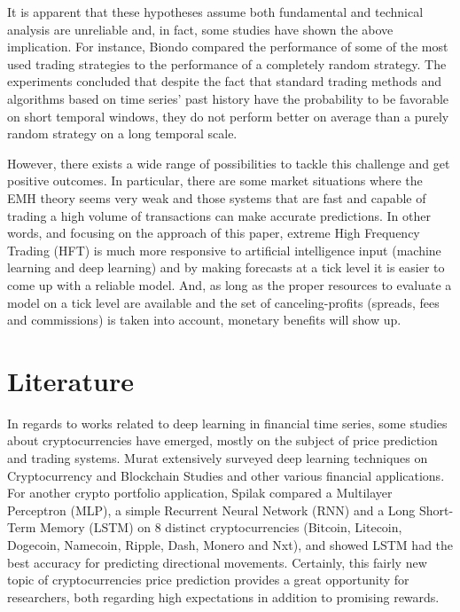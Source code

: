 \documentclass[10pt,twocolumn,letterpaper]{article}
\begin{document}
It is apparent that these hypotheses assume both fundamental and technical analysis are unreliable and, in fact, some studies have shown the above implication. For instance, Biondo \etal \cite{Biondo} compared the performance of some of the most used trading strategies to the performance of a completely random strategy. The experiments concluded that despite the fact that standard trading methods and algorithms based on time series’ past history have the probability to be favorable on short temporal windows, they do not perform better on average than a purely random strategy on a long temporal scale.

However, there exists a wide range of possibilities to tackle this challenge and get positive outcomes. In particular, there are some market situations where the EMH theory seems very weak and those systems that are fast and capable of trading a high volume of transactions can make accurate predictions. In other words, and focusing on the approach of this paper, extreme High Frequency Trading (HFT) is much more responsive to artificial intelligence input (machine learning and deep learning) and by making forecasts at a tick level it is easier to come up with a reliable model. And, as long as the proper resources to evaluate a model on a tick level are available and the set of canceling-profits (spreads, fees and commissions) is taken into account, monetary benefits will show up.

\section{Literature}

In regards to works related to deep learning in financial time series, some studies about cryptocurrencies have emerged, mostly on the subject of price prediction and trading systems. Murat \etal \cite{Murat} extensively surveyed deep learning techniques on Cryptocurrency and Blockchain Studies and other various financial applications. For another crypto portfolio application, Spilak \cite{Spilak} compared a Multilayer Perceptron (MLP), a simple Recurrent Neural Network (RNN) and a Long Short-Term Memory (LSTM) on 8 distinct cryptocurrencies (Bitcoin, Litecoin, Dogecoin, Namecoin, Ripple, Dash, Monero and Nxt), and showed LSTM had the best accuracy for predicting directional movements. Certainly, this fairly new topic of cryptocurrencies price prediction provides a great opportunity for researchers, both regarding high expectations in addition to promising rewards.
\end{document}

